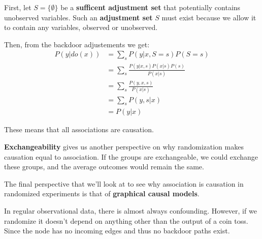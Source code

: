 First, let $S = \{\emptyset\}$ be a \textbf{sufficent adjustment set} that potentially contains unobserved variables. Such an \textbf{adjustment set} $S$ must exist because we allow it to contain any variables, observed or unobserved. 

Then, from the backdoor adjustements we get:
\begin{equation}
    \begin{array}{ll}
        P(y|do(x)) & = \sum_s P(y|x, S = s)P(S = s)  \\
            & = \sum_s \frac{P(y|x, s)P(x|s)P(s)}{P(x | s)} \\
            & = \sum_s \frac{P(y, x, s)}{P(x | s)} \\
            & = \sum_s P(y, s| x) \\
            & = P(y | x)
    \end{array}
\end{equation}

These means that all associations are causation.

\textbf{Exchangeability} gives us another perspective on why randomization makes causation equal to association. If the groups are exchangeable, we could exchange these groups, and the average outcomes would remain the same.

The final perspective that we'll look at to see why association is causation in randomized experiments is that of \textbf{graphical causal models}.

In regular observational data, there is almost always confounding. However, if we randomize  it doesn't depend on anything other than the output of a coin toss. Since the node has no incoming edges and thus no backdoor paths exist.